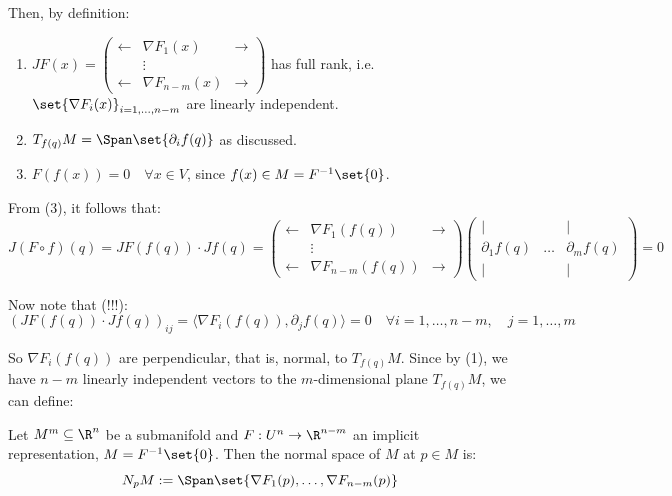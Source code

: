 Then, by definition:
\begin{enumerate}
    \item $JF(x) = \begin{pmatrix} \longleftarrow & \nabla F_1(x) & \longrightarrow \\ & \vdots & \\ \longleftarrow & \nabla F_{n-m}(x) & \longrightarrow \end{pmatrix}$ has full rank, i.e. $\set{\nabla F_i(x)}_{i=1,\dots,n-m}$ are linearly independent.
    \item $T_{f(q)} M = \Span\set{\partial_i f(q)}$ as discussed.
    \item $F(f(x)) = 0 \quad \forall x \in V$, since $f(x) \in M = F^{-1}\set{0}$.
\end{enumerate}

From (3), it follows that:
\[ J(F \circ f)(q) = JF(f(q)) \cdot Jf(q) = \begin{pmatrix} \longleftarrow & \nabla F_1(f(q)) & \longrightarrow \\ & \vdots & \\ \longleftarrow & \nabla F_{n-m}(f(q)) & \longrightarrow \end{pmatrix} \begin{pmatrix} | & & | \\ \partial_1 f(q) & \dots & \partial_m f(q) \\ | & & | \end{pmatrix} = 0 \]

Now note that \textcolor{eDarkRed}{(!!!)}:
\[ (JF(f(q)) \cdot Jf(q))_{ij} = \langle \nabla F_i(f(q)), \partial_j f(q) \rangle = 0 \quad \forall i=1,\dots,n-m, \quad j=1,\dots,m \]

So $\nabla F_i(f(q))$ are perpendicular, that is, normal, to $T_{f(q)} M$. Since by (1), we have $n-m$ linearly independent vectors to the $m$-dimensional plane $T_{f(q)} M$, we can define:

\begin{definition*}
Let $M^m \subseteq \R^n$ be a submanifold and $F: U^n \to \R^{n-m}$ an implicit representation, $M = F^{-1}\set{0}$.
Then the normal space of $M$ at $p \in M$ is:
\[ N_p M := \Span\set{\nabla F_1(p), \dots, \nabla F_{n-m}(p)} \]
\end{definition*}

